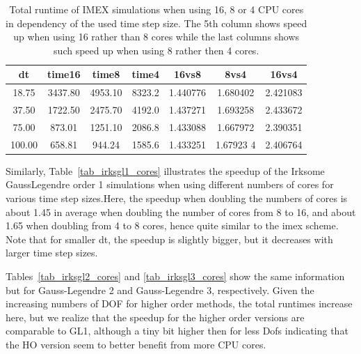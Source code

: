 \documentclass[a4paper, 12pt]{article}
\begin{document}
\begin{table}[h]\centering
\begin{tabular}{c|c|c|c|c|c|c}
dt &  time16  &  time8  & time4  &   16vs8   &   8vs4     & 16vs4     \\\hline
18.75 & 3437.80 & 4953.10 & 8323.2 & 1.440776 & 1.680402  & 2.421083\\
37.50 & 1722.50 & 2475.70 & 4192.0 & 1.437271 & 1.693258  & 2.433672\\
75.00  & 873.01 & 1251.10  &2086.8 & 1.433088 & 1.667972  & 2.390351\\
100.00 &  658.81 &  944.24&  1585.6 & 1.433251 & 1.67923 4& 2.406764
\end{tabular}
\caption{Total runtime of IMEX simulations when using 16, 8 or 4 CPU cores in dependency of the used time step size. The 5th column shows speed up when using 16 rather than 8 cores while the last columns shows such speed up when using 8 rather then 4 cores.}
\label{tab_imex_cores}
\end{table}

Similarly, Table~\ref{tab_irksgl1_cores} illustrates the speedup of the
Irksome GaussLegendre order 1 simulations when using different numbers of
cores for various time step sizes.Here, the speedup when doubling the numbers of cores is about 1.45 in average when doubling the number of cores from 8 to 16, and about 1.65 when doubling from 4 to 8 cores, hence quite similar to the imex scheme. Note that for smaller dt, the speedup is slightly bigger, but it decreases with larger time step sizes.


Tables~\ref{tab_irksgl2_cores} and \ref{tab_irksgl3_cores} show the same information but for Gauss-Legendre 2 and Gauss-Legendre 3, respectively. Given the increasing numbers of DOF for higher order methods, the total runtimes increase here, but we realize that the speedup for the higher order versions are comparable to GL1, although a tiny bit higher then for less Dofs indicating that the HO version seem to better benefit from more CPU cores.
\end{document}
